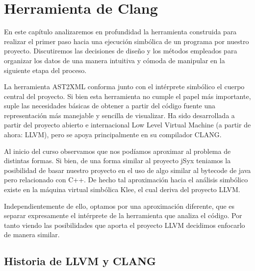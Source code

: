 %
%

\chapter{Herramienta de Clang}

\pagestyle{plain}

En este cap\'itulo analizaremos en profundidad la herramienta construida para realizar el primer paso hacia una ejecuci\'on simb\'olica de un programa por nuestro proyecto. Discutiremos las decisiones de dise\~no y los m\'etodos empleados para organizar los datos de una manera intuitiva y c\'omoda de manipular en la siguiente etapa del proceso. 

La herramienta AST2XML conforma junto con el int\'erprete simb\'olico el cuerpo central del proyecto. Si bien esta herramienta no cumple el papel m\'as importante, suple las necesidades b\'asicas de obtener a partir del c\'odigo fuente una representaci\'on m\'as manejable y sencilla de visualizar. Ha sido desarrollada a partir del proyecto abierto e internacional Low Level Virtual Machine (a partir de ahora: LLVM), pero se apoya principalmente en su compilador CLANG.

Al inicio del curso observamos que nos pod\'iamos aproximar al problema de distintas formas. Si bien, de una forma similar al proyecto jSyx teniamos la posibilidad de basar nuestro proyecto en el uso de algo similar al bytecode de java pero relacionado con C++. De hecho tal aproximaci\'on hacia el an\'alisis simb\'olico existe en la m\'aquina virtual simb\'olica Klee, el cual deriva del proyecto LLVM. 

Independientemente de ello, optamos por una aproximaci\'on diferente, que es separar expresamente el int\'erprete de la herramienta que analiza el c\'odigo. Por tanto viendo las posibilidades que aporta el proyecto LLVM decidimos enfocarlo de manera similar.


\section{Historia de LLVM y CLANG}

